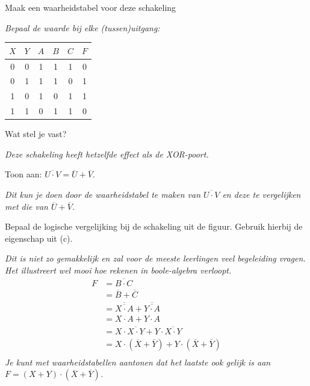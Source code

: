 \begin{nummering}
\begin{werktekstoef}


\item[a.]{Maak een waarheidstabel voor deze schakeling}

\emph{Bepaal de waarde bij elke (tussen)uitgang:}
\begin{center}
\begin{tabular}{c c|c c c|c}  
$X$ & $Y$ & $A$ & $B$ & $C$ & $F$\\
\hline
0 & 0 & 1 & 1 & 1 & 0 \\
0 & 1 & 1 & 1 & 0 & 1 \\
1 & 0 & 1 & 0 & 1 & 1 \\
1 & 1 & 0 & 1 & 1 & 0 
\end{tabular}
\end{center}

\item[b.]{Wat stel je vast?}

\emph{Deze schakeling heeft hetzelfde effect als de XOR-poort.}

\item[c.]{Toon aan: $\overline{U\cdot V}=\overline{U}+\overline{V}$.}

\emph{Dit kun je doen door de waarheidstabel te maken van $\overline{U\cdot V}$ en deze te vergelijken met die van $\overline{U}+\overline{V}$.}

\item[d.]{Bepaal de logische vergelijking bij de schakeling uit de figuur. Gebruik hierbij de eigenschap uit (c).}

\emph{Dit is niet zo gemakkelijk en zal voor de meeste leerlingen veel begeleiding vragen. Het illustreert wel mooi hoe rekenen in boole-algebra verloopt.
\begin{align*}
F&=\overline{B\cdot C}\\
&=\overline{B}+\overline{C}\\
&=\overline{\overline{X\cdot A}} + \overline{\overline{Y\cdot A}}\\
&= X\cdot A +Y\cdot A \\
&= X\cdot \overline{X\cdot Y}+ Y\cdot \overline{X\cdot Y}\\
&= X\cdot (\overline{X}+\overline{Y})+Y\cdot (\overline{X}+\overline{Y})\\
\end{align*}
Je kunt met waarheidstabellen aantonen dat het laatste ook gelijk is aan $F=(X+Y)\cdot (\overline{X}+\overline{Y})$.
}


\end{werktekstoef}  



\end{nummering}
